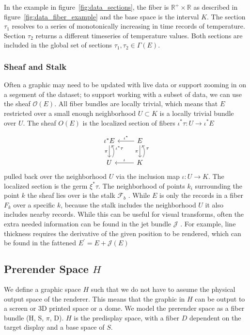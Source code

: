 \documentclass[../main.tex]{subfiles}
\begin{document}
In the example in figure~\ref{fig:data_sections}, the fiber is $\mathbb{R}^+\times \mathbb{R}$ as described in figure~\ref{fig:data_fiber_example} and the base space is the interval $K$. The section $\tau_1$ resolves to a series of monotonically increasing in time records of temperature. Section $\tau_2$ returns a different timeseries of temperature values. Both sections are included in the global set of sections $\tau_1, \tau_2 \in \Gamma(E)$.

\subsubsection{Sheaf and Stalk}
\label{sec:data_sheaf_stalk}
Often a graphic may need to be updated with live data or support zooming in on a segement of the dataset; to support working with a subset of data, we can use the sheaf $\mathcal{O}(E)$. All fiber bundles are locally trivial, which means that $E$ restricted over a small enough neighborhood $U \subset K$ is a locally trivial bundle over $U$\cite{LocallyTrivialFibre}. The sheaf $O(E)$ is the localized section of fibers $\iota^*\tau: U \rightarrow \iota^*E$

\begin{equation}
    \label{eq:sheaf}
    \begin{tikzcd}
        \iota^*E \arrow[d, "\pi"']           & E \arrow[d, "\pi"'] \arrow[l, "\iota^*"']         \\
        U \arrow[u, "\iota^*\tau"', bend right] & K \arrow[u, "\tau"', bend right] \arrow[l, "\iota"']
        \end{tikzcd}
\end{equation}
pulled back over the neighborhood $U$ via the inclusion map $\iota: U \rightarrow K$. The localized section is the germ $\xi^*\tau$. The neighborhood of points $k_i$ surrounding the point $k$ the sheaf lies over is the stalk $\mathcal{F}_b$ \cite{StalkSheaf2019,spanier1989algebraic}. While $E$ is only the records in a fiber $F_k$ over a specific $k$, because the stalk includes the neighborhood $U$ it also includes nearby records. While this can be useful for visual transforms, often the extra needed information can be found in the jet bundle $\mathcal{J}$ \cite{JetBundle2020,musilovaCalculusVariationsJet2016}. For example, line thickness requires the derivative of the given position to be rendered, which can be found in the fattened $E^\prime=E+\mathcal{J}(E)$


\subsection{Prerender Space $H$}
\label{sec:graphic}
We define a graphic space $H$ such that we do not have to assume the physical output space of the renderer. This means that the graphic in $H$ can be output to a screen or 3D printed space or a dome. We model the prerender space as a fiber bundle (H, S, $\pi$, D). $H$ is the predisplay space, with a fiber $D$ dependent on the target display and a base space of $S$. 
\end{document}
